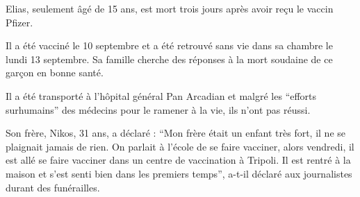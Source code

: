 Elias, seulement âgé de 15 ans, est mort trois jours après avoir reçu le vaccin
Pfizer.

Il a été vacciné le 10 septembre et a été retrouvé sans vie dans sa chambre le
lundi 13 septembre. Sa famille cherche des réponses à la mort soudaine de ce
garçon en bonne santé.

Il a été transporté à l'hôpital général Pan Arcadian et malgré les “efforts
surhumains” des médecins pour le ramener à la vie, ils n'ont pas réussi.

Son frère, Nikos, 31 ans, a déclaré : “Mon frère était un enfant très fort, il
ne se plaignait jamais de rien. On parlait à l'école de se faire vacciner, alors
vendredi, il est allé se faire vacciner dans un centre de vaccination à
Tripoli. Il est rentré à la maison et s'est senti bien dans les premiers temps”,
a-t-il déclaré aux journalistes durant des funérailles.

